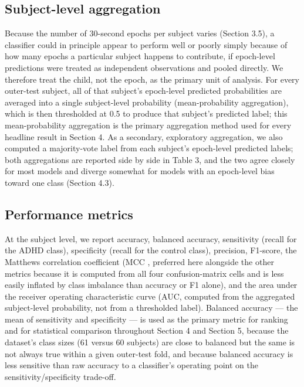 \documentclass[a4paper,fleqn]{cas-sc}
\begin{document}
\subsection{Subject-level aggregation}

Because the number of 30-second epochs per subject varies (Section 3.5), a classifier could in principle appear to perform well or poorly simply because of how many epochs a particular subject happens to contribute, if epoch-level predictions were treated as independent observations and pooled directly. We therefore treat the child, not the epoch, as the primary unit of analysis. For every outer-test subject, all of that subject's epoch-level predicted probabilities are averaged into a single subject-level probability (mean-probability aggregation), which is then thresholded at 0.5 to produce that subject's predicted label; this mean-probability aggregation is the primary aggregation method used for every headline result in Section 4. As a secondary, exploratory aggregation, we also computed a majority-vote label from each subject's epoch-level predicted labels; both aggregations are reported side by side in Table 3, and the two agree closely for most models and diverge somewhat for models with an epoch-level bias toward one class (Section 4.3).



\subsection{Performance metrics}

At the subject level, we report accuracy, balanced accuracy, sensitivity (recall for the ADHD class), specificity (recall for the control class), precision, F1-score, the Matthews correlation coefficient (MCC \cite{chicco2020advantages}, preferred here alongside the other metrics because it is computed from all four confusion-matrix cells and is less easily inflated by class imbalance than accuracy or F1 alone), and the area under the receiver operating characteristic curve (AUC, computed from the aggregated subject-level probability, not from a thresholded label). Balanced accuracy --- the mean of sensitivity and specificity --- is used as the primary metric for ranking and for statistical comparison throughout Section 4 and Section 5, because the dataset's class sizes (61 versus 60 subjects) are close to balanced but the same is not always true within a given outer-test fold, and because balanced accuracy is less sensitive than raw accuracy to a classifier's operating point on the sensitivity/specificity trade-off.
\end{document}
